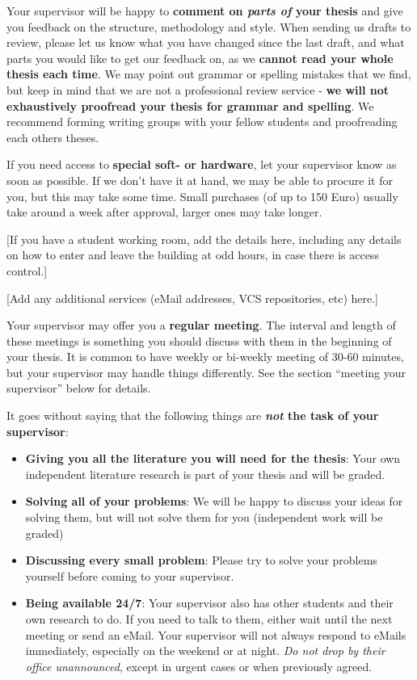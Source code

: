 \documentclass[a4paper, 11pt, hidelinks]{article}
\begin{document}
Your supervisor will be happy to \textbf{comment on \emph{parts of} your thesis} and give you feedback on the structure, methodology and style. 
When sending us drafts to review, please let us know what you have changed since the last draft, and what parts you would like to get our feedback on, as we \textbf{cannot read your whole thesis each time}.
We may point out grammar or spelling mistakes that we find, but keep in mind that we are not a professional review service - \textbf{we will not exhaustively proofread your thesis for grammar and spelling}.
We recommend forming writing groups with your fellow students and proofreading each others theses.

If you need access to \textbf{special soft- or hardware}, let your supervisor know as soon as possible.
If we don’t have it at hand, we may be able to procure it for you, but this may take some time.
Small purchases (of up to 150 Euro) usually take around a week after approval, larger ones may take longer.

[If you have a student working room, add the details here, including any details on how to enter and leave the building at odd hours, in case there is access control.]

[Add any additional services (eMail addresses, VCS repositories, etc) here.]

Your supervisor may offer you a \textbf{regular meeting}. 
The interval and length of these meetings is something you should discuss with them in the beginning of your thesis.
It is common to have weekly or bi-weekly meeting of 30-60 minutes, but your supervisor may handle things differently.
See the section ``meeting your supervisor'' below for details.

It goes without saying that the following things are \textbf{\emph{not} the task of your supervisor}:

\begin{itemize}
	\item \textbf{Giving you all the literature you will need for the thesis}: Your own independent literature research is part of your thesis and will be graded.
	\item \textbf{Solving all of your problems}: We will be happy to discuss your ideas for solving them, but will not solve them for you (independent work will be graded)
	\item \textbf{Discussing every small problem}: Please try to solve your problems yourself before coming to your supervisor.
	\item \textbf{Being available 24/7}: Your supervisor also has other students and their own research to do. If you need to talk to them, either wait until the next meeting or send an eMail. Your supervisor will not always respond to eMails immediately, especially on the weekend or at night. \emph{Do not drop by their office unannounced}, except in urgent cases or when previously agreed.
\end{itemize}
\end{document}
